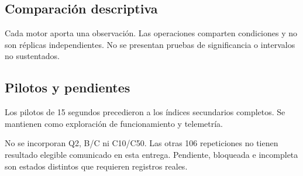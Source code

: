 \subsection{Comparación descriptiva}

Cada motor aporta una observación. Las operaciones comparten condiciones
y no son réplicas independientes. No se presentan pruebas de significancia
o intervalos no sustentados.

\subsection{Pilotos y pendientes}
Los pilotos de 15 segundos precedieron a los índices secundarios completos.
Se mantienen como exploración de funcionamiento y telemetría.

No se incorporan Q2, B/C ni C10/C50. Las otras 106 repeticiones no tienen
resultado elegible comunicado en esta entrega. Pendiente, bloqueada e
incompleta son estados distintos que requieren registros reales.
